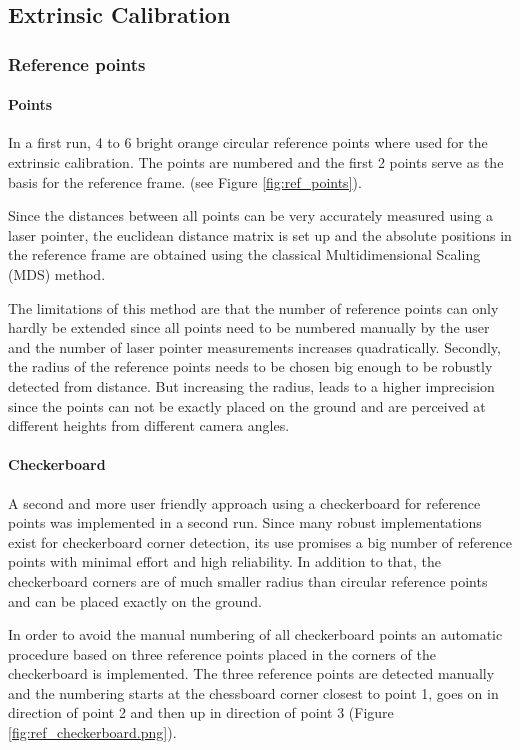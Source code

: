 \subsection{Extrinsic Calibration}
\label{sec:extrinsic}
\subsubsection{Reference points}

\paragraph{Points} 
In a first run, 4 to 6 bright orange circular reference points where used for the extrinsic calibration. The points are numbered and the first 2 points serve as the basis for the reference frame. (see Figure \ref{fig:ref_points}).

Since the distances between all points can be very accurately measured using a laser pointer, the euclidean distance matrix is set up and the absolute positions in the reference frame are obtained using the classical Multidimensional Scaling (MDS) method. \cite{Wickelmaier2003}

The limitations of this method are that the number of reference points can only hardly be extended since all points need to be numbered manually by the user and the number of laser pointer measurements increases quadratically.
Secondly, the radius of the reference points needs to be chosen big enough to be robustly detected from distance. But increasing the radius, leads to a higher imprecision since the points can not be exactly placed on the ground and are perceived at different heights from different camera angles.

\paragraph{Checkerboard}
A second and more user friendly approach using a checkerboard for reference points was implemented in a second run. 
Since many robust implementations exist for checkerboard corner detection, its use promises a big number of reference points with minimal effort and high reliability. 
In addition to that, the checkerboard corners are of much smaller radius than circular reference points and can be placed exactly on the ground.

In order to avoid the manual numbering of all checkerboard points an automatic procedure based on three reference points placed in the corners of the checkerboard is implemented. 
The three reference points are detected manually and the numbering starts at the chessboard corner closest to point 1, goes on in direction of point 2 and then up in direction of point 3 (Figure \ref{fig:ref_checkerboard.png}).

